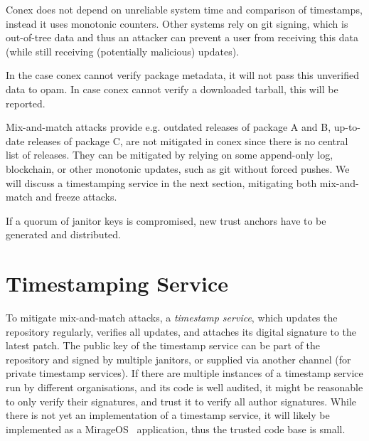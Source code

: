 \documentclass[nocopyrightspace]{sigplanconf}
\newcommand{\TODO}[1]{\textbf{[TODO: #1]}}
\begin{document}
Conex does not depend on unreliable system time and comparison of timestamps, instead it uses monotonic counters.
Other systems rely on git signing, which is out-of-tree data and thus an attacker can prevent a user from receiving this data (while still receiving (potentially malicious) updates).

In the case conex cannot verify package metadata, it will not pass this unverified data to opam.
In case conex cannot verify a downloaded tarball, this will be reported.

Mix-and-match attacks provide e.g. outdated releases of package A and B, up-to-date releases of package C, are not mitigated in conex since there is no central list of releases.
They can be mitigated by relying on some append-only log, blockchain, or other monotonic updates, such as git without forced pushes.
We will discuss a timestamping service in the next section, mitigating both mix-and-match and freeze attacks.

If a quorum of janitor keys is compromised, new trust anchors have to be generated and distributed.

\section{Timestamping Service} \label{sec:shortcuts}


To mitigate mix-and-match attacks, a \emph{timestamp service}, which updates the repository regularly, verifies all updates, and attaches its digital signature to the latest patch.
The public key of the timestamp service can be part of the repository and signed by multiple janitors, or supplied via another channel (for private timestamp services).
If there are multiple instances of a timestamp service run by different organisations, and its code is well audited, it might be reasonable to only verify their signatures, and trust it to verify all author signatures.
While there is not yet an implementation of a timestamp service, it will likely be implemented as a MirageOS~\cite{mirage,nqsb-tls} application, thus the trusted code base is small.
\end{document}
